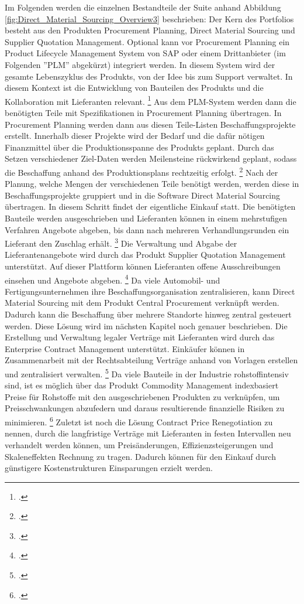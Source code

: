 Im Folgenden werden die einzelnen Bestandteile der Suite anhand Abbildung \ref{fig:Direct_Material_Sourcing_Overview3} beschrieben: Der Kern des Portfolios besteht aus den Produkten Procurement Planning, Direct Material Sourcing und Supplier Quotation Management. Optional kann vor Procurement Planning ein Product Lifecycle Management System von SAP oder einem Drittanbieter (im Folgenden ''PLM'' abgekürzt) integriert werden. In diesem System wird der gesamte Lebenszyklus des Produkts, von der Idee bis zum Support verwaltet. In diesem Kontext ist die Entwicklung von Bauteilen des Produkts und die Kollaboration mit Lieferanten relevant. \footcite[Vgl.][]{theorie_sap_plm_übersicht_2024} Aus dem PLM-System werden dann die benötigten Teile mit Spezifikationen in Procurement Planning übertragen. In Procurement Planning werden dann aus diesen Teile-Listen Beschaffungsprojekte erstellt. Innerhalb dieser Projekte wird der Bedarf und die dafür nötigen Finanzmittel über die Produktionsspanne des Produkts geplant. Durch das Setzen verschiedener Ziel-Daten werden Meilensteine rückwirkend geplant, sodass die Beschaffung anhand des Produktionsplans rechtzeitig erfolgt. \footcite[Vgl.][]{theorie_sap_procurement_planning_overview_2024} Nach der Planung, welche Mengen der verschiedenen Teile benötigt werden, werden diese in Beschaffungsprojekte gruppiert und in die Software Direct Material Sourcing übertragen. In diesem Schritt findet der eigentliche Einkauf statt. Die benötigten Bauteile werden ausgeschrieben und Lieferanten können in einem mehrstufigen Verfahren Angebote abgeben, bis dann nach mehreren Verhandlungsrunden ein Lieferant den Zuschlag erhält. \footcite[Vgl.][]{theorie_sap_webseite_dms_übersicht_2024} Die Verwaltung und Abgabe der Lieferantenangebote wird durch das Produkt Supplier Quotation Management unterstützt. Auf dieser Plattform können Lieferanten offene Ausschreibungen einsehen und Angebote abgeben. \footcite[Vgl.][]{theorie_sap_supplier_quotation_management_help_2024} Da viele Automobil- und Fertigungsunternehmen ihre Beschaffungsorganisation zentralisieren, kann Direct Material Sourcing mit dem Produkt Central Procurement verknüpft werden. Dadurch kann die Beschaffung über mehrere Standorte hinweg zentral gesteuert werden. Diese Lösung wird im nächsten Kapitel noch genauer beschrieben. Die Erstellung und Verwaltung legaler Verträge mit Lieferanten wird durch das Enterprise Contract Management unterstützt. Einkäufer können in Zusammenarbeit mit der Rechtsabteilung Verträge anhand von Vorlagen erstellen und zentralisiert verwalten. \footcite[Vgl.][]{theorie_sap_enterprise_contract_management_2024} Da viele Bauteile in der Industrie rohstoffintensiv sind, ist es möglich über das Produkt Commodity Management indexbasiert Preise für Rohstoffe mit den ausgeschriebenen Produkten zu verknüpfen, um Preisschwankungen abzufedern und daraus resultierende finanzielle Risiken zu minimieren. \footcite[Vgl.][]{theorie_sap_commodity_management_2024} Zuletzt ist noch die Lösung Contract Price Renegotiation zu nennen, durch die langfristige Verträge mit Lieferanten in festen Intervallen neu verhandelt werden können, um Preisänderungen, Effizienzsteigerungen und Skaleneffekten Rechnung zu tragen. Dadurch können für den Einkauf durch günstigere Kostenstrukturen Einsparungen erzielt werden. 